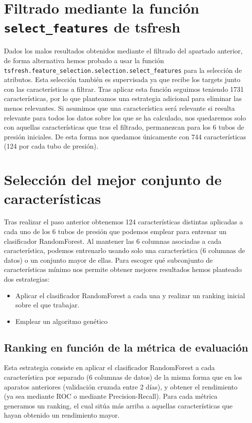 \documentclass[a4paper,12pt,twoside,oldfontcommands]{memoir}
\begin{document}
\section{Filtrado mediante la función \texttt{select\_features} de tsfresh}
Dados los malos resultados obtenidos mediante el filtrado del apartado anterior, de forma alternativa hemos probado a usar la función
\texttt{tsfresh.feature\_selection.selection.select\_features} para la selección de atributos. Esta selección también es supervisada ya que recibe los targets junto con las características a filtrar. Tras aplicar esta función seguimos teniendo 1731 características, por lo que planteamos una estrategia adicional para eliminar las menos relevantes. Si asumimos que una característica será relevante si resulta relevante para todos los datos sobre los que se ha calculado, nos quedaremos solo con aquellas características que tras el filtrado, permanezcan para los 6 tubos de presión iniciales. De esta forma nos quedamos únicamente con 744 características (124 por cada tubo de presión). 

\section{Selección del mejor conjunto de características}

Tras realizar el paso anterior obtenemos 124 características distintas aplicadas a cada uno de los 6 tubos de presión que podemos emplear para entrenar un clasificador RandomForest. Al mantener las 6 columnas asociadas a cada característica, podemos entrenarlo usando solo una característica (6 columnas de datos) o un conjunto mayor de ellas. Para escoger qué subconjunto de características mínimo nos permite obtener mejores resultados hemos planteado dos estrategias: 

\begin{itemize}
    \item Aplicar el clasificador RandomForest a cada una y realizar un ranking inicial sobre el que trabajar. 
    \item Emplear un algoritmo genético
\end{itemize}

\subsection{Ranking en función de la métrica de evaluación}
Esta estrategia consiste en aplicar el clasificador RandomForest a cada característica por separado (6 columnas de datos) de la misma forma que en los aparatos anteriores (validación cruzada entre 2 días), y obtener el rendimiento (ya sea mediante ROC o mediante Precision-Recall). Para cada métrica generamos un ranking, el cual sitúa más arriba a aquellas características que hayan obtenido un rendimiento mayor. 
\end{document}
